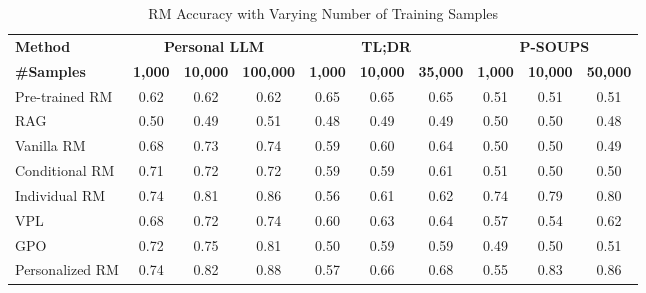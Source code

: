 \begin{table*}[h]
\centering
\small
\begin{tabular}{l|ccc|ccc|ccc}
\toprule
\textbf{Method}                     & \multicolumn{3}{c|}{\textbf{Personal LLM}} & \multicolumn{3}{c|}{\textbf{TL;DR}} & \multicolumn{3}{c}{\textbf{P-SOUPS}} \\ 
            \textbf{\#Samples}                        & \textbf{1,000} & \textbf{10,000} & \textbf{100,000} & \textbf{1,000} & \textbf{10,000} & \textbf{35,000} & \textbf{1,000} & \textbf{10,000} & \textbf{50,000} \\ 
\midrule
Pre-trained RM                   & 0.62          & 0.62            & 0.62             & 0.65         & 0.65           & 0.65           & 0.51         & 0.51           & 0.51           \\ 
RAG                                 &      0.50        &       0.49        &      0.51         &        0.48     &       0.49        &     0.49          &   0.50           &        0.50       &        0.48       \\ 
Vanilla RM                          &     0.68          &   0.73            &            0.74    &       0.59       &        0.60       &          0.64     &       0.50       &       0.50        &         0.49      \\ 
Conditional RM                      &        0.71      &     0.72           &         0.72      &      0.59        &    0.59         &    0.61         &    0.51         &          0.50     &    0.50           \\  
Individual RM        &     0.74          &       0.81       &       0.86                      &     0.56          &      0.61         &      0.62         &  0.74         & 0.79           &  0.80      \\ 
VPL                                 &         0.68     &        0.72      &      0.74         &                0.60            &       0.63      &        0.64       &       0.57       &   0.54            &     0.62          \\ 
GPO                                 &      0.72        &         0.75      &       0.81        &    0.50          &      0.59         &      0.59         &     0.49         &     0.50           &     0.51          \\ 
Personalized RM                     &     0.74          &    0.82             &   0.88            &     0.57         &        0.66       &        0.68       &       0.55       &     0.83          &    0.86           \\ 
\bottomrule
\end{tabular}
\caption{RM Accuracy with Varying Number of Training Samples}
\label{table: main_results}
\end{table*}

